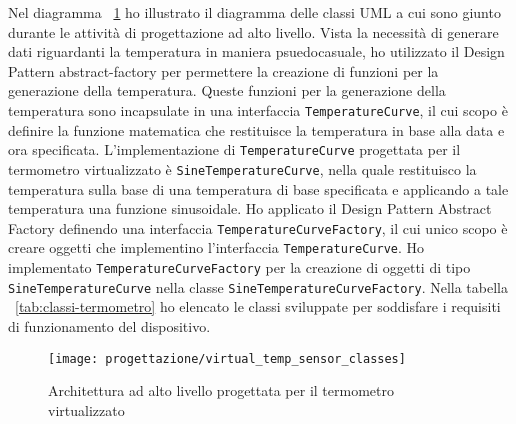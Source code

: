 Nel diagramma ~\ref{fig:classi-termometro} ho illustrato il diagramma delle classi UML a cui sono giunto durante le attività di progettazione ad alto livello. Vista la necessità di generare dati riguardanti la temperatura in maniera psuedocasuale, ho utilizzato il Design Pattern \gls{abstract-factory} per permettere la creazione di funzioni per la generazione della temperatura. Queste funzioni per la generazione della temperatura sono incapsulate in una interfaccia \texttt{TemperatureCurve}, il cui scopo è definire la funzione matematica che restituisce la temperatura in base alla data e ora specificata. L'implementazione di \texttt{TemperatureCurve} progettata per il termometro virtualizzato è \texttt{SineTemperatureCurve}, nella quale restituisco la temperatura sulla base di una temperatura di base specificata e applicando a tale temperatura una funzione sinusoidale.
Ho applicato il Design Pattern Abstract Factory definendo una interfaccia \texttt{TemperatureCurveFactory}, il cui unico scopo è creare oggetti che implementino l'interfaccia \texttt{TemperatureCurve}. Ho implementato \texttt{TemperatureCurveFactory} per la creazione di oggetti di tipo \texttt{SineTemperatureCurve} nella classe \texttt{SineTemperatureCurveFactory}.
Nella tabella ~\ref{tab:classi-termometro} ho elencato le classi sviluppate per soddisfare i requisiti di funzionamento del dispositivo.

\begin{figure}[!h]
    \centering
    \texttt{[image: progettazione/virtual\_temp\_sensor\_classes]}
    \caption{Architettura ad alto livello progettata per il termometro virtualizzato}
    \label{fig:classi-termometro}
\end{figure}

